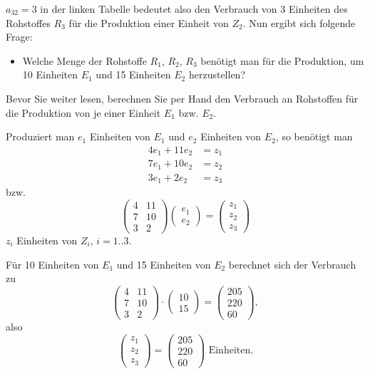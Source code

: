 $a_{32} = 3$ in der linken Tabelle bedeutet also den Verbrauch von 3 Einheiten des Rohstoffes $R_3$ für die Produktion einer Einheit von $Z_2$. Nun ergibt sich folgende Frage:
\begin{itemize}
  \item Welche Menge der Rohstoffe $R_1$, $R_2$, $R_3$ benötigt man für die Produktion, um 10 Einheiten $E_1$ und 15 Einheiten $E_2$ herzustellen?
\end{itemize}

Bevor Sie weiter lesen, berechnen Sie per Hand den Verbrauch an Rohstoffen für die Produktion von je einer Einheit $E_1$ bzw. $E_2$.

Produziert man $e_1$ Einheiten von $E_1$ und $e_2$ Einheiten von $E_2$, so benötigt man
\begin{align*}
  4e_1 + 11e_2 &= z_1\\
  7e_1 + 10e_2 &= z_2\\
  3e_1 + 2e_2 &= z_3
\end{align*}
bzw.
\[ \begin{pmatrix} 4 & 11 \\ 7 & 10 \\ 3 & 2 \end{pmatrix} \begin{pmatrix} e_1 \\ e_2 \end{pmatrix} = \begin{pmatrix} z_1 \\ z_2 \\ z_3 \end{pmatrix} \]
$z_i$ Einheiten von $Z_i$, $i = 1..3$.

Für 10 Einheiten von $E_1$ und 15 Einheiten von $E_2$ berechnet sich der Verbrauch zu
\[ \begin{pmatrix} 4 & 11 \\ 7 & 10 \\ 3 & 2 \end{pmatrix} \cdot \begin{pmatrix} 10 \\ 15 \end{pmatrix} = \begin{pmatrix} 205 \\ 220 \\ 60 \end{pmatrix} , \]
also
\[ \begin{pmatrix} z_1 \\ z_2 \\ z_3 \end{pmatrix} = \begin{pmatrix} 205 \\ 220 \\ 60 \end{pmatrix} \text{ Einheiten.} \]


